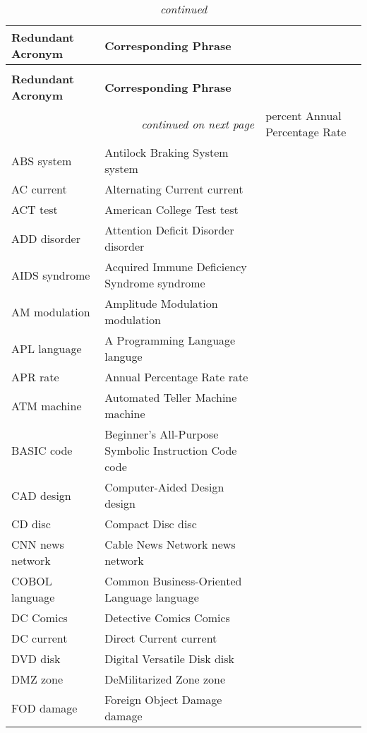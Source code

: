 {
  \noindent
  \begin{longtable}{@{}ll@{}}
      \caption{Redundant Acronyms}\\
      \toprule
      \bfseries Redundant Acronym& \bfseries Corresponding Phrase\\
      \hline
    \endfirsthead
      \caption[]{\emph{continued}}\\
      \midrule
      \bfseries Redundant Acronym& \bfseries Corresponding Phrase\\
      \midrule
    \endhead
      \hline
      \multicolumn{2}{r}{\emph{continued on next page}}
    \endfoot
      \bottomrule
    \endlastfoot
    \% APR&               percent Annual Percentage Rate\\
    ABS system&           Antilock Braking System system\\
    AC current&           Alternating Current current\\
    ACT test&             American College Test test\\
    ADD disorder&         Attention Deficit Disorder disorder\\
    AIDS syndrome&        Acquired Immune Deficiency Syndrome syndrome\\
    AM modulation&        Amplitude Modulation modulation\\
    APL language&         A Programming Language languge\\
    APR rate&             Annual Percentage Rate rate\\
    ATM machine&          Automated Teller Machine machine\\
    BASIC code&           Beginner's All-Purpose Symbolic Instruction Code code\\
    CAD design&           Computer-Aided Design design\\
    CD disc&              Compact Disc disc\\
    CNN news network&     Cable News Network news network\\
    COBOL language&	      Common Business-Oriented Language language\\
    DC Comics&            Detective Comics Comics\\
    DC current&           Direct Current current\\
    DVD disk&             Digital Versatile Disk disk\\
    DMZ zone&             DeMilitarized Zone zone\\
    FOD damage&           Foreign Object Damage damage\\

\end{longtable}}

